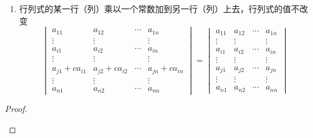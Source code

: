 {\begin{enumerate}[label = {\textup{(\arabic*)}}]
\begin{align*}
\begin{vmatrix}
                      \vdots & \vdots &        & \vdots \\
                      b_{r1} & b_{r2} & \cdots & b_{rn} \\
                      \vdots & \vdots &        & \vdots \\
                      a_{n1} & a_{n2} & \cdots & a_{nn}
                  \end{vmatrix}
              \end{align*}
        \item 行列式的某一行（列）乘以一个常数加到另一行（列）上去，行列式的值不改变
              \[
                  \begin{vmatrix}
                      a_{11}         & a_{12}         & \cdots & a_{1n}         \\
                      \vdots         & \vdots         &        & \vdots         \\
                      a_{i1}         & a_{i2}         & \cdots & a_{in}         \\
                      \vdots         & \vdots         &        & \vdots         \\
                      a_{j1}+ca_{i1} & a_{j2}+ca_{i2} & \cdots & a_{jn}+ca_{in} \\
                      \vdots         & \vdots         &        & \vdots         \\
                      a_{n1}         & a_{n2}         & \cdots & a_{nn}
                  \end{vmatrix}=
                  \begin{vmatrix}
                      a_{11} & a_{12} & \cdots & a_{1n} \\
                      \vdots & \vdots &        & \vdots \\
                      a_{i1} & a_{i2} & \cdots & a_{in} \\
                      \vdots & \vdots &        & \vdots \\
                      a_{j1} & a_{j2} & \cdots & a_{jn} \\
                      \vdots & \vdots &        & \vdots \\
                      a_{n1} & a_{n2} & \cdots & a_{nn}
                  \end{vmatrix}
              \]
    \end{enumerate}
    \begin{proof}
        \begin{enumerate}[label = {\textup{(\arabic*)}}]

\end{enumerate}
\end{proof}}
